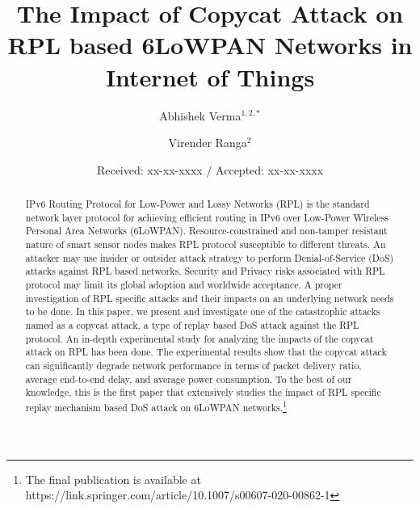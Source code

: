 \documentclass[]{svjour3}                     %
\begin{document}
	
	\title{The Impact of Copycat Attack on RPL based 6LoWPAN Networks in Internet of Things}
	
	
	\author{Abhishek Verma$^{1,2,*}$\and
		Virender Ranga$^{2}$
	}
	

	
	\date{Received: xx-xx-xxxx / Accepted: xx-xx-xxxx}
	\maketitle
\begin{abstract}
	IPv6 Routing Protocol for Low-Power and Lossy Networks (RPL) is the standard network layer protocol for achieving efficient routing in IPv6 over Low-Power Wireless Personal Area Networks (6LoWPAN). Resource-constrained and non-tamper resistant nature of smart sensor nodes makes RPL protocol susceptible to different threats.  An attacker may use insider or outsider attack strategy to perform Denial-of-Service (DoS) attacks against RPL based networks. Security and Privacy risks associated with RPL protocol may limit its global adoption and worldwide acceptance. A proper investigation of RPL specific attacks and their impacts on an underlying network needs to be done. In this paper, we present and investigate one of the catastrophic attacks named as a copycat attack, a type of replay based DoS attack against the RPL protocol. An in-depth experimental study for analyzing the impacts of the copycat attack on RPL has been done. The experimental results show that the copycat attack can significantly degrade network performance in terms of packet delivery ratio, average end-to-end delay, and average power consumption. To the best of our knowledge, this is the first paper that extensively studies the impact of RPL specific replay mechanism based DoS attack on 6LoWPAN networks.\footnote{The final publication is available at https://link.springer.com/article/10.1007/s00607-020-00862-1} 
\end{abstract}
\end{document}
